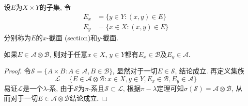 \documentclass[cn, 12pt, math=mtpro2, bibstyle=apa, blue, twocol]{elegantbook}
\newcommand{\SE}{\mathcal{S}}
\begin{document}
\begin{definition}
设$E$为$X\times Y$的子集, 令
\begin{align*}
E_x&=\{y\in Y: (x,y)\in E\} \\
E_y&=\{x\in X: (x,y)\in E\}
\end{align*}
分别称为$E$的$x$-截面 (section)和$y$-截面.
\end{definition}
\begin{lemma}\label{lem:lem1.4}
如果$E\in\mathcal{A}\otimes\mathcal{B}$, 则对于任意$x\in X$, $y\in Y$都有$E_x\in\mathcal{B}$及$E_y\in\mathcal{A}$.
\end{lemma}
\begin{proof}
  令$\SE=\{A\times B:A\in\mathcal{A}, B\in\mathcal{B}\}$, 显然对于一切$E\in\SE$, 结论成立. 再定义集族
  $$\mathcal{L}=\{E\in \mathcal{A}\otimes \mathcal{B}:x\in X,y\in Y, E_x\in\mathcal{B}, E_y\in\mathcal{A}\}$$
  易证$\mathcal{L}$是一个$\lambda$-系, 由于$\SE$为$\pi$-系且$\SE\subset\mathcal{L}$, 根据$\pi-\lambda$定理可知$\sigma(\SE)=\mathcal{A}\otimes \mathcal{B}$, 从而对于一切$E\in\mathcal{A}\otimes\mathcal{B}$结论成立.

\end{proof}
\end{document}
